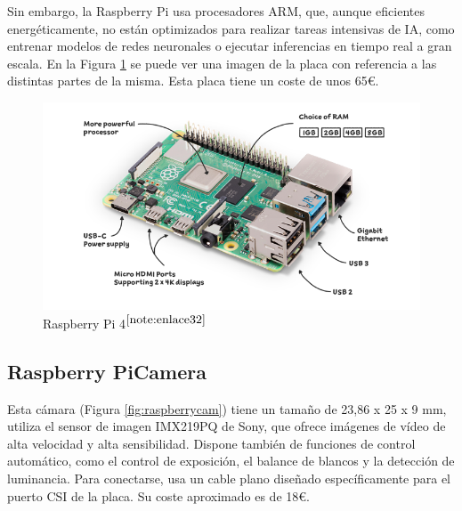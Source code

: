 Sin embargo, la Raspberry Pi usa procesadores ARM, que, aunque eficientes energéticamente, no están optimizados para realizar tareas intensivas de \ac{IA}, como entrenar modelos de redes neuronales o ejecutar inferencias en tiempo real a gran escala. En la Figura \ref{fig:raspberry} se puede ver una imagen de la placa con referencia a las distintas partes de la misma. Esta placa tiene un coste de unos 65€. 


\begin{figure} [h!]
	\begin{center}
		\includegraphics[width=14cm]{figs/raspberrypi4.png}
	\end{center}
	\caption{Raspberry Pi 4$^{\ref{note:enlace32}}$} 
\label{fig:raspberry}
\end{figure}

\setcounter{footnote}{32} %

\subsection{Raspberry PiCamera}
\label{subsec:picamera}

Esta cámara (Figura \ref{fig:raspberrycam}) tiene un tamaño de 23,86 x 25 x 9 mm, utiliza el sensor de imagen IMX219PQ de Sony, que ofrece imágenes de vídeo de alta velocidad y alta sensibilidad. Dispone también de funciones de control automático, como el control de exposición, el balance de blancos y la detección de luminancia. Para conectarse, usa un cable plano diseñado específicamente para el puerto \ac{CSI} de la placa. Su coste aproximado es de 18€. 



